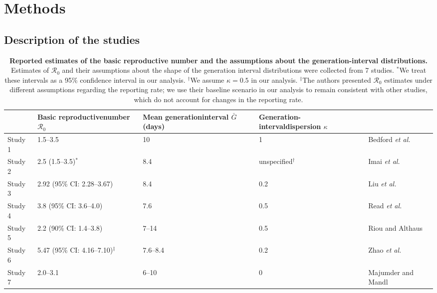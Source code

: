 \documentclass[12pt]{article}
\newcommand{\Ro}{\ensuremath{{\mathcal R}_{0}}\xspace}
\begin{document}
\section{Methods}

\subsection{Description of the studies}

\begin{table}[t]
\begin{center}
\scriptsize
\begin{tabular}{l|p{3.5cm}|p{2.5cm}|p{2.7cm}|l}
 & Basic reproductive\newline number \Ro & Mean generation\newline interval $\bar G$ (days) & Generation-interval\newline dispersion $\kappa$ & \\
\hline
Study 1 & 1.5--3.5 & 10 & 1 & Bedford \textit{et al.} \cite{bedfordncov} \\
\hline
Study 2 & 2.5 (1.5--3.5)$^\ast$ & 8.4 & unspecified$^\dagger$ & Imai \textit{et al.} \cite{imaincov} \\
\hline
Study 3 & 2.92 (95\% CI: 2.28--3.67) & 8.4 & 0.2 & Liu \textit{et al.} \cite{liuncov} \\
\hline
Study 4 & 3.8 (95\% CI: 3.6--4.0) & 7.6 & 0.5 & Read \textit{et al.} \cite{readncov} \\
\hline
Study 5 & 2.2 (90\% CI: 1.4--3.8) & 7--14 & 0.5 & Riou and Althaus \cite{riouncov} \\
\hline
Study 6 & 5.47 (95\% CI: 4.16--7.10)$^\ddagger$ & 7.6--8.4 & 0.2 & Zhao \textit{et al.} \cite{zhaoncov} \\
\hline
Study 7 & 2.0--3.1 & 6--10 & 0 & Majumder and Mandl \cite{majumderncov} \\
\hline
\end{tabular}
\end{center}
\caption{
\textbf{Reported estimates of the basic reproductive number and the assumptions about the generation-interval distributions.}
Estimates of \Ro and their assumptions about the shape of the generation interval distributions were collected from 7 studies.
$^\ast$We treat these intervals as a 95\% confidence interval in our analysis.
$^\dagger$We assume $\kappa = 0.5$ in our analysis.
$^\ddagger$The authors presented \Ro estimates under different assumptions regarding the reporting rate; we use their baseline scenario in our analysis to remain consistent with other studies, which do not account for changes in the reporting rate.
}
\end{table}
\end{document}
